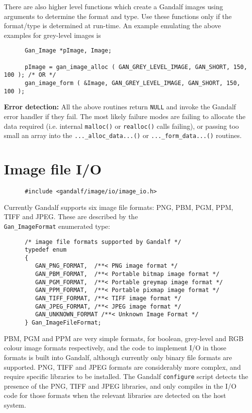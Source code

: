 There are also higher level functions which create a Gandalf images using
arguments to determine the format and type. Use these functions only if
the format/type is determined at run-time. An example emulating the above
examples for grey-level images is
\begin{verbatim}
      Gan_Image *pImage, Image;

      pImage = gan_image_alloc ( GAN_GREY_LEVEL_IMAGE, GAN_SHORT, 150, 100 ); /* OR */
      gan_image_form ( &Image, GAN_GREY_LEVEL_IMAGE, GAN_SHORT, 150, 100 );
\end{verbatim}

{\bf Error detection:} All the above routines return {\tt NULL} and invoke the
Gandalf error handler if they fail. The most likely failure modes are failing
to allocate the data required (i.e. internal {\tt malloc()} or {\tt realloc()}
calls failing), or passing too small an array into the
{\tt ...\_alloc\_data...()} or  {\tt ...\_form\_data...()} routines.

\section{Image file I/O}
\begin{verbatim}
      #include <gandalf/image/io/image_io.h>
\end{verbatim}
Currently Gandalf supports six image file formats: PNG, PBM, PGM, PPM, TIFF
and JPEG. These are described by the\\ {\tt Gan\_ImageFormat} enumerated type:
\begin{verbatim}
      /* image file formats supported by Gandalf */
      typedef enum
      {
         GAN_PNG_FORMAT,  /**< PNG image format */
         GAN_PBM_FORMAT,  /**< Portable bitmap image format */
         GAN_PGM_FORMAT,  /**< Portable greymap image format */
         GAN_PPM_FORMAT,  /**< Portable pixmap image format */
         GAN_TIFF_FORMAT, /**< TIFF image format */
         GAN_JPEG_FORMAT, /**< JPEG image format */
         GAN_UNKNOWN_FORMAT /**< Unknown Image Format */
      } Gan_ImageFileFormat;
\end{verbatim}
PBM, PGM and PPM are very simple formats, for boolean, grey-level and
RGB colour image formats respectively, and the code to implement I/O in those
formats is built into Gandalf, although currently only binary file formats
are supported. PNG, TIFF and JPEG formats are considerably
more complex, and require specific libraries to be installed.
The Gandalf {\tt configure} script detects the presence of the PNG,
TIFF and JPEG libraries, and only compiles
in the I/O code for those formats when the relevant libraries
are detected on the host system.

